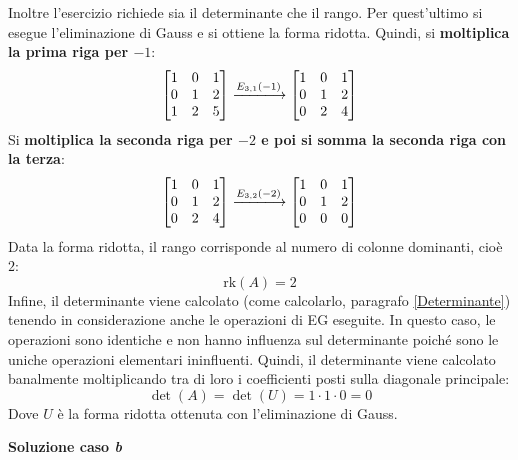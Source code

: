 \documentclass[a4paper]{article}
\begin{document}
	\noindent
	Inoltre l'esercizio richiede sia il determinante che il rango. Per quest'ultimo si esegue l'eliminazione di Gauss e si ottiene la forma ridotta. Quindi, si \textbf{moltiplica la prima riga per $-1$}:
	\begin{equation*}
		\begin{bmatrix}
			1 & 0 & 1 \\
			0 & 1 & 2 \\
			1 & 2 & 5
		\end{bmatrix}
		\xlongrightarrow{E_{3,1}\left(-1\right)}
		\begin{bmatrix}
			1 & 0 & 1 \\
			0 & 1 & 2 \\
			0 & 2 & 4
		\end{bmatrix}
	\end{equation*}
	Si \textbf{moltiplica la seconda riga per $-2$ e poi si somma la seconda riga con la terza}:
	\begin{equation*}
		\begin{bmatrix}
			1 & 0 & 1 \\
			0 & 1 & 2 \\
			0 & 2 & 4
		\end{bmatrix}
		\xlongrightarrow{E_{3,2}\left(-2\right)}
		\begin{bmatrix}
			1 & 0 & 1 \\
			0 & 1 & 2 \\
			0 & 0 & 0
		\end{bmatrix}
	\end{equation*}
	Data la forma ridotta, il rango corrisponde al numero di colonne dominanti, cioè $2$:
	\begin{equation*}
		\mathrm{rk}\left(A\right) = 2
	\end{equation*}
	Infine, il determinante viene calcolato (come calcolarlo, paragrafo \ref{Determinante}) tenendo in considerazione anche le operazioni di EG eseguite. In questo caso, le operazioni sono identiche e non hanno influenza sul determinante poiché sono le uniche operazioni elementari ininfluenti. Quindi, il determinante viene calcolato banalmente moltiplicando tra di loro i coefficienti posti sulla diagonale principale:
	\begin{equation*}
		\det\left(A\right) = \det\left(U\right) = 1 \cdot 1 \cdot 0 = 0
	\end{equation*}
	Dove $U$ è la forma ridotta ottenuta con l'eliminazione di Gauss.\newpage
	
	\noindent
	\textcolor{Green4}{\textbf{Soluzione caso \emph{b}}}\newline
	
\end{document}
